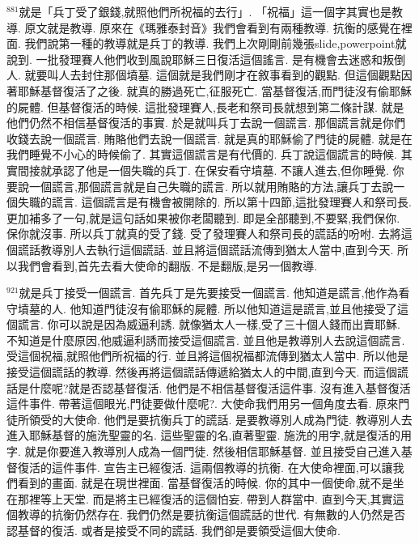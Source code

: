 \documentclass{book}
\begin{document}
$^{881}$就是「兵丁受了銀錢,就照他們所祝福的去行」.
「祝福」這一個字其實也是教導.
原文就是教導.
原來在《瑪雅泰封音》我們會看到有兩種教導.
抗衡的感覺在裡面.
我們說第一種的教導就是兵丁的教導.
我們上次剛剛前幾張slide,powerpoint就說到.
一批發理賽人他們收到風說耶穌三日復活這個謠言.
是有機會去迷惑和叛倒人.
就要叫人去封住那個墳墓.
這個就是我們剛才在敘事看到的觀點.
但這個觀點因著耶穌基督復活了之後.
就真的勝過死亡,征服死亡.
當基督復活,而門徒沒有偷耶穌的屍體.
但基督復活的時候.
這批發理賽人,長老和祭司長就想到第二條計謀.
就是他們仍然不相信基督復活的事實.
於是就叫兵丁去說一個謊言.
那個謊言就是你們收錢去說一個謊言.
賄賂他們去說一個謊言.
就是真的耶穌偷了門徒的屍體.
就是在我們睡覺不小心的時候偷了.
其實這個謊言是有代價的.
兵丁說這個謊言的時候.
其實間接就承認了他是一個失職的兵丁.
在保安看守墳墓.
不讓人進去,但你睡覺.
你要說一個謊言,那個謊言就是自己失職的謊言.
所以就用賄賂的方法,讓兵丁去說一個失職的謊言.
這個謊言是有機會被開除的.
所以第十四節,這批發理賽人和祭司長.
更加補多了一句,就是這句話如果被你老闆聽到.
即是全部聽到,不要緊,我們保你.
保你就沒事.
所以兵丁就真的受了錢.
受了發理賽人和祭司長的謊話的吩咐.
去將這個謊話教導別人去執行這個謊話.
並且將這個謊話流傳到猶太人當中,直到今天.
所以我們會看到,首先去看大使命的翻版.
不是翻版,是另一個教導.

$^{921}$就是兵丁接受一個謊言.
首先兵丁是先要接受一個謊言.
他知道是謊言,他作為看守墳墓的人.
他知道門徒沒有偷耶穌的屍體.
所以他知道這是謊言,並且他接受了這個謊言.
你可以說是因為威逼利誘.
就像猶太人一樣,受了三十個人錢而出賣耶穌.
不知道是什麼原因,他威逼利誘而接受這個謊言.
並且他是教導別人去說這個謊言.
受這個祝福,就照他們所祝福的行.
並且將這個祝福都流傳到猶太人當中.
所以他是接受這個謊話的教導.
然後再將這個謊話傳遞給猶太人的中間,直到今天.
而這個謊話是什麼呢?就是否認基督復活.
他們是不相信基督復活這件事.
沒有進入基督復活這件事件.
帶著這個眼光,門徒要做什麼呢?.
大使命我們用另一個角度去看.
原來門徒所領受的大使命.
他們是要抗衡兵丁的謊話.
是要教導別人成為門徒.
教導別人去進入耶穌基督的施洗聖靈的名.
這些聖靈的名,直著聖靈.
施洗的用字,就是復活的用字.
就是你要進入教導別人成為一個門徒.
然後相信耶穌基督.
並且接受自己進入基督復活的這件事件.
宣告主已經復活.
這兩個教導的抗衡.
在大使命裡面,可以讓我們看到的畫面.
就是在現世裡面.
當基督復活的時候.
你的其中一個使命,就不是坐在那裡等上天堂.
而是將主已經復活的這個怕妄.
帶到人群當中.
直到今天,其實這個教導的抗衡仍然存在.
我們仍然是要抗衡這個謊話的世代.
有無數的人仍然是否認基督的復活.
或者是接受不同的謊話.
我們卻是要領受這個大使命.
\end{document}
